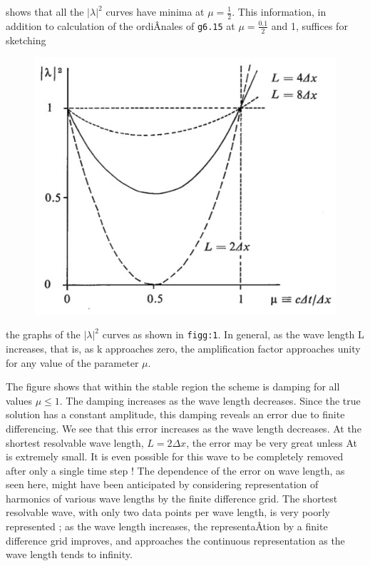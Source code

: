 shows that all the \(|\lambda|^{2}\) curves have minima at
\(\mu = \frac{1}{2}\). This information, in addition to calculation of
the ordiÂ­nales of \texttt{g6.15} at \(\mu = \frac{0.1}{2}\) and 1,
suffices for sketching

\begin{figure}
    \centering
    \includegraphics[width = .7 \textwidth]{figs/NM/pic4.jpg}
    \caption{} \label{fig:}
\end{figure}

the graphs of the \(\left| \lambda \right|^{2}\) curves as shown in
\texttt{figg:1}. In general, as the wave length L increases, that is, as
k approaches zero, the amplification factor approaches unity for any
value of the parameter \(\mu\).

The figure shows that within the stable region the scheme is damping for
all values \(\mu \leq 1\). The damping increases as the wave length
decreases. Since the true solution has a constant amplitude, this
damping reveals an error due to finite differencing. We see that this
error increases as the wave length decreases. At the shortest resolvable
wave length, \(L = 2\Delta x\), the error may be very great unless At is
extremely small. It is even possible for this wave to be completely
removed after only a single time step ! The dependence of the error on
wave length, as seen here, might have been anticipated by considering
representation of harmonics of various wave lengths by the finite
difference grid. The shortest resolvable wave, with only two data points
per wave length, is very poorly represented ; as the wave length
increases, the representaÂ­tion by a finite difference grid improves, and
approaches the continuous representation as the wave length tends to
infinity.

